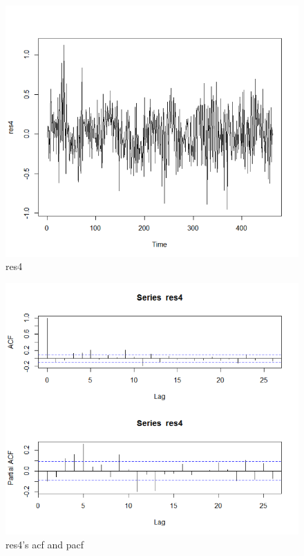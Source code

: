 \documentclass[a4paper,11pt]{article}
\begin{document}
\begin{figure}[H]
\centering
\caption{res4}
\includegraphics[scale=.80]{Picture11.png}
\end{figure}

\begin{figure}[H]
\centering
\caption{res4's acf and pacf}
\includegraphics[scale=.80]{Picture12.png}
\end{figure}
\end{document}
